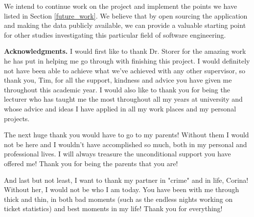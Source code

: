 \documentclass{mpaper}
\begin{document}
We intend to continue work on the project and implement the points we have listed in Section \ref{future_work}. We believe
that by open sourcing the application and making the data publicly available, we can provide a valuable starting point 
for other studies investigating this particular field of software engineering.

\vskip8pt \noindent
{\bf Acknowledgments.}
I would first like to thank Dr. Storer for the amazing work he has put in helping me go through with finishing 
this project. I would definitely not have been able to achieve what we've achieved with any other supervisor, so 
thank you, Tim, for all the support, kindness and advice you have given me throughout this academic year. I would 
also like to thank you for being the lecturer who has taught me the most throughout all my years at university
and whose advice and ideas I have applied in all my work places and my personal projects.

The next huge thank you would have to go to my parents! Without them I would 
not be here and I wouldn't have accomplished so much, both in my personal and professional lives. 
I will always treasure the unconditional support you have offered me! Thank you for being the parents that you are!

And last but not least, I want to thank my partner in "crime" and in life, Corina! Without her, I would not be who I 
am today. You have been with me through thick and thin, in both bad moments (such as the endless nights working 
on ticket statistics) and best moments in my life! Thank you for everything!



\end{document}
